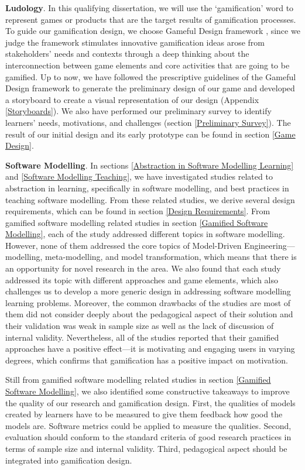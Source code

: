 \documentclass[12pt, a4paper]{report}
\begin{document}
{\textbf{Ludology}. In this qualifying dissertation, we will use the `gamification' word to represent games or products that are the target results of gamification processes. To guide our gamification design, we choose Gameful Design framework \cite{deterding2015lens}, since we judge the framework stimulates innovative gamification ideas arose from stakeholders' needs and contexts through a deep thinking about the interconnection between game elements and core activities that are going to be gamified. Up to now, we have followed the prescriptive guidelines of the Gameful Design framework to generate the preliminary design of our game and developed a storyboard to create a visual representation of our design (Appendix \ref{Storyboards}). We also have performed our preliminary survey to identify learners' needs, motivations, and challenges (section \ref{Preliminary Survey}). The result of our initial design and its early prototype can be found in section \ref{Game Design}.

\textbf{Software Modelling}. In sections \ref{Abstraction in Software Modelling Learning} and \ref{Software Modelling Teaching}, we have investigated studies related to abstraction in learning, specifically in software modelling, and best practices in teaching software modelling. From these related studies, we derive several design requirements, which can be found in section \ref{Design Requirements}. From gamified software modelling related studies in section \ref{Gamified Software Modelling}, each of the study addressed different topics in software modelling. However, none of them addressed the core topics of Model-Driven Engineering---modelling, meta-modelling, and model transformation, which means that there is an opportunity for novel research in the area. We also found that each study addressed its topic with different approaches and game elements, which also challenges us to develop a more generic design in addressing software modelling learning problems. Moreover, the common drawbacks of the studies are most of them did not consider deeply about the pedagogical aspect of their solution and their validation was weak in sample size as well as the lack of discussion of internal validity. Nevertheless, all of the studies reported that their gamified approaches have a positive effect---it is motivating and engaging users in varying degrees, which confirms that gamification has a positive impact on motivation.

Still from gamified software modelling related studies in section \ref{Gamified Software Modelling}, we also identified some constructive takeaways to improve the quality of our research and gamification design. First, the qualities of models created by learners have to be measured to give them feedback how good the models are. Software metrics could be applied to measure the qualities. Second, evaluation should conform to the standard criteria of good research practices in terms of sample size and internal validity. Third, pedagogical aspect should be integrated into gamification design.       

}
\end{document}
